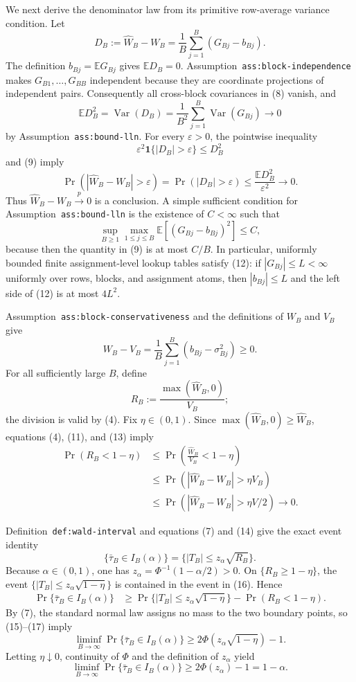 We next derive the denominator law from its primitive row-average variance condition. Let
\[
D_B:=\widehat W_B-W_B
=\frac1B\sum_{j=1}^B(G_{Bj}-b_{Bj}).
\tag{8}
\]
The definition \(b_{Bj}=\mathbb E G_{Bj}\) gives \(\mathbb E D_B=0\). Assumption~\texttt{ass:block-independence} makes \(G_{B1},\ldots,G_{BB}\) independent because they are coordinate projections of independent pairs. Consequently all cross-block covariances in (8) vanish, and
\[
\mathbb E D_B^2
=\operatorname{Var}(D_B)
=\frac1{B^2}\sum_{j=1}^B\operatorname{Var}(G_{Bj})
\longrightarrow0
\tag{9}
\]
by Assumption~\texttt{ass:bound-lln}. For every \(\varepsilon>0\), the pointwise inequality
\[
\varepsilon^2\mathbf 1\{|D_B|>\varepsilon\}\le D_B^2
\tag{10}
\]
and (9) imply
\[
\Pr(|\widehat W_B-W_B|>\varepsilon)
=\Pr(|D_B|>\varepsilon)
\le \frac{\mathbb E D_B^2}{\varepsilon^2}
\longrightarrow0.
\tag{11}
\]
Thus \(\widehat W_B-W_B\xrightarrow{p}0\) is a conclusion. A simple sufficient condition for Assumption~\texttt{ass:bound-lln} is the existence of \(C<\infty\) such that
\[
\sup_{B\ge1}\max_{1\le j\le B}
\mathbb E[(G_{Bj}-b_{Bj})^2]\le C,
\tag{12}
\]
because then the quantity in (9) is at most \(C/B\). In particular, uniformly bounded finite assignment-level lookup tables satisfy (12): if \(|G_{Bj}|\le L<\infty\) uniformly over rows, blocks, and assignment atoms, then \(|b_{Bj}|\le L\) and the left side of (12) is at most \(4L^2\).

Assumption~\texttt{ass:block-conservativeness} and the definitions of \(W_B\) and \(V_B\) give
\[
W_B-V_B
=\frac1B\sum_{j=1}^B(b_{Bj}-\sigma_{Bj}^2)\ge0.
\tag{13}
\]
For all sufficiently large \(B\), define
\[
R_B:=\frac{\max(\widehat W_B,0)}{V_B};
\tag{14}
\]
the division is valid by (4). Fix \(\eta\in(0,1)\). Since \(\max(\widehat W_B,0)\ge\widehat W_B\), equations (4), (11), and (13) imply
\[
\begin{aligned}
\Pr(R_B<1-\eta)
&\le \Pr\!\left(\frac{\widehat W_B}{V_B}<1-\eta\right)\\
&\le \Pr\!\left(|\widehat W_B-W_B|>\eta V_B\right)\\
&\le \Pr\!\left(|\widehat W_B-W_B|>\eta V/2\right)
\longrightarrow0.
\end{aligned}
\tag{15}
\]

Definition~\texttt{def:wald-interval} and equations (7) and (14) give the exact event identity
\[
\{\bar\tau_B\in I_B(\alpha)\}
=\{|T_B|\le z_\alpha\sqrt{R_B}\}.
\tag{16}
\]
Because \(\alpha\in(0,1)\), one has \(z_\alpha=\Phi^{-1}(1-\alpha/2)>0\). On \(\{R_B\ge1-\eta\}\), the event \(\{|T_B|\le z_\alpha\sqrt{1-\eta}\}\) is contained in the event in (16). Hence
\[
\begin{aligned}
\Pr\{\bar\tau_B\in I_B(\alpha)\}
&\ge
\Pr\{|T_B|\le z_\alpha\sqrt{1-\eta}\}
-\Pr(R_B<1-\eta).
\end{aligned}
\tag{17}
\]
By (7), the standard normal law assigns no mass to the two boundary points, so (15)--(17) imply
\[
\liminf_{B\to\infty}\Pr\{\bar\tau_B\in I_B(\alpha)\}
\ge2\Phi\!\left(z_\alpha\sqrt{1-\eta}\right)-1.
\tag{18}
\]
Letting \(\eta\downarrow0\), continuity of \(\Phi\) and the definition of \(z_\alpha\) yield
\[
\liminf_{B\to\infty}\Pr\{\bar\tau_B\in I_B(\alpha)\}
\ge2\Phi(z_\alpha)-1=1-\alpha.
\tag{19}
\]

